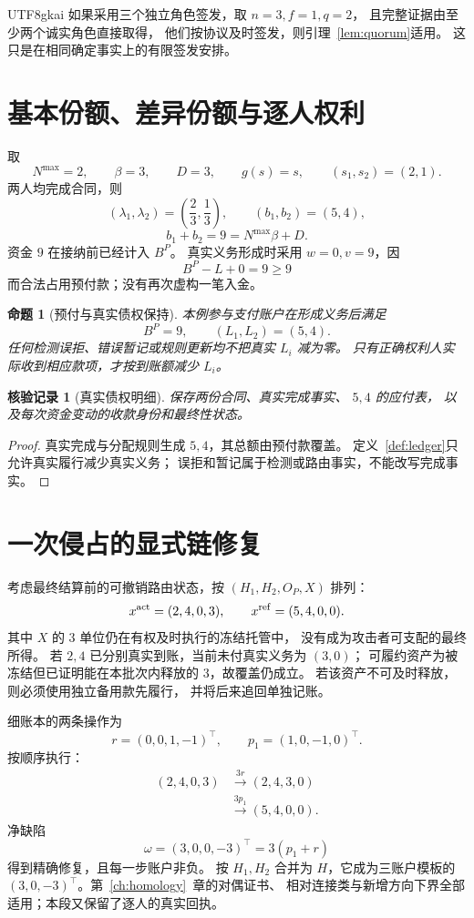 \documentclass[12pt,a4paper,openany]{report}
\newtheorem{proposition}{命题}[chapter]
\newtheorem{Certificate}{核验记录}[chapter]
\begin{document}
\begin{CJK*}{UTF8}{gkai}
如果采用三个独立角色签发，取 \(n=3,f=1,q=2\)，
且完整证据由至少两个诚实角色直接取得，
他们按协议及时签发，则引理~\ref{lem:quorum}适用。
这只是在相同确定事实上的有限签发安排。

\section{基本份额、差异份额与逐人权利}
取
\[
N^{\max}=2,\qquad \beta=3,\qquad D=3,\qquad
g(s)=s,\qquad (s_1,s_2)=(2,1).
\]
两人均完成合同，则
\[
(\lambda_1,\lambda_2)=\left(\frac23,\frac13\right),
\qquad (b_1,b_2)=(5,4),
\]
\[
b_1+b_2=9=N^{\max}\beta+D.
\]
资金 \(9\) 在接纳前已经计入 \(B^P\)。
真实义务形成时采用 \(w=0,v=9\)，因
\[
B^P-L+0=9\ge9
\]
而合法占用预付款；没有再次虚构一笔入金。

\begin{proposition}[预付与真实债权保持]
本例参与支付账户在形成义务后满足
\[
B^P=9,\qquad (L_1,L_2)=(5,4).
\]
任何检测误拒、错误暂记或规则更新均不把真实 \(L_i\) 减为零。
只有正确权利人实际收到相应款项，才按到账额减少 \(L_i\)。
\end{proposition}
\begin{Certificate}[真实债权明细]
保存两份合同、真实完成事实、 \(5,4\) 的应付表，
以及每次资金变动的收款身份和最终性状态。
\end{Certificate}
\begin{proof}
真实完成与分配规则生成 \(5,4\)，其总额由预付款覆盖。
定义~\ref{def:ledger}只允许真实履行减少真实义务；
误拒和暂记属于检测或路由事实，不能改写完成事实。
\end{proof}

\section{一次侵占的显式链修复}
考虑最终结算前的可撤销路由状态，按
\((H_1,H_2,O_P,X)\) 排列：
\[
x^{\rm act}=(2,4,0,3),\qquad
x^{\rm ref}=(5,4,0,0).
\]
其中 \(X\) 的 \(3\) 单位仍在有权及时执行的冻结托管中，
没有成为攻击者可支配的最终所得。
若 \(2,4\) 已分别真实到账，当前未付真实义务为 \((3,0)\)；
可履约资产为被冻结但已证明能在本批次内释放的 \(3\)，故覆盖仍成立。
若该资产不可及时释放，则必须使用独立备用款先履行，
并将后来追回单独记账。

细账本的两条操作为
\[
r=(0,0,1,-1)^\top,\qquad
p_1=(1,0,-1,0)^\top.
\]
按顺序执行：
\[
\begin{aligned}
(2,4,0,3)&\xrightarrow{3r}(2,4,3,0)\\
&\xrightarrow{3p_1}(5,4,0,0).
\end{aligned}
\]
净缺陷
\[
\omega=(3,0,0,-3)^\top=3(p_1+r)
\]
得到精确修复，且每一步账户非负。
按 \(H_1,H_2\) 合并为 \(H\)，它成为三账户模板的
\((3,0,-3)^\top\)。第~\ref{ch:homology}~章的对偶证书、
相对连接类与新增方向下界全部适用；本段又保留了逐人的真实回执。


\end{CJK*}
\end{document}
